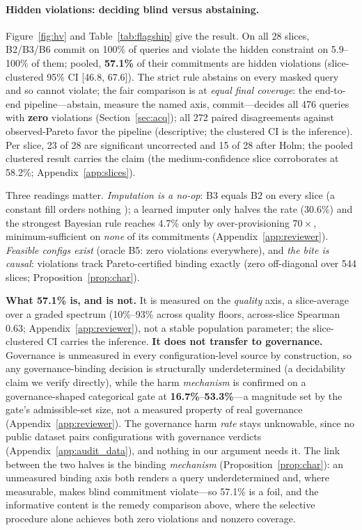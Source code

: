 \documentclass{article} %
\begin{document}
\paragraph{Hidden violations: deciding blind versus abstaining.}
Figure~\ref{fig:hv} and Table~\ref{tab:flagship} give the result. On all 28 slices, B2/B3/B6 commit on 100\% of queries and violate the hidden constraint on 5.9--100\% of them; pooled, \textbf{57.1\%} of their commitments are hidden violations (slice-clustered 95\% CI [46.8, 67.6]). The strict rule abstains on every masked query and so cannot violate; the fair comparison is at \emph{equal final coverage}: the end-to-end pipeline---abstain, measure the named axis, commit---decides all 476 queries with \textbf{zero} violations (Section~\ref{sec:acq}); all 272 paired disagreements against observed-Pareto favor the pipeline (descriptive; the clustered CI is the inference). Per slice, 23 of 28 are significant uncorrected and 15 of 28 after Holm; the pooled clustered result carries the claim (the medium-confidence slice corroborates at 58.2\%; Appendix~\ref{app:slices}).

 Three readings matter. \emph{Imputation is a no-op}: B3 equals B2 on every slice (a constant fill orders nothing \citep{manski2003partial}); a learned imputer only halves the rate (30.6\%) and the strongest Bayesian rule reaches 4.7\% only by over-provisioning $70\times$, minimum-sufficient on \emph{none} of its commitments (Appendix~\ref{app:reviewer}). \emph{Feasible configs exist} (oracle B5: zero violations everywhere), and \emph{the bite is causal}: violations track Pareto-certified binding exactly (zero off-diagonal over 544 slices; Proposition~\ref{prop:char}).

 \textbf{What 57.1\% is, and is not.} It is measured on the \emph{quality} axis, a slice-average over a graded spectrum (10\%--93\% across quality floors, across-slice Spearman 0.63; Appendix~\ref{app:reviewer}), not a stable population parameter; the slice-clustered CI carries the inference. \textbf{It does not transfer to governance.} Governance is unmeasured in every configuration-level source by construction, so any governance-binding decision is structurally underdetermined (a decidability claim we verify directly), while the harm \emph{mechanism} is confirmed on a governance-shaped categorical gate at \textbf{16.7\%}--\textbf{53.3\%}---a magnitude set by the gate's admissible-set size, not a measured property of real governance (Appendix~\ref{app:reviewer}). The governance harm \emph{rate} stays unknowable, since no public dataset pairs configurations with governance verdicts (Appendix~\ref{app:audit_data}), and nothing in our argument needs it. The link between the two halves is the binding \emph{mechanism} (Proposition~\ref{prop:char}): an unmeasured binding axis both renders a query underdetermined and, where measurable, makes blind commitment violate---so 57.1\% is a foil, and the informative content is the remedy comparison above, where the selective procedure alone achieves both zero violations and nonzero coverage.
\end{document}
